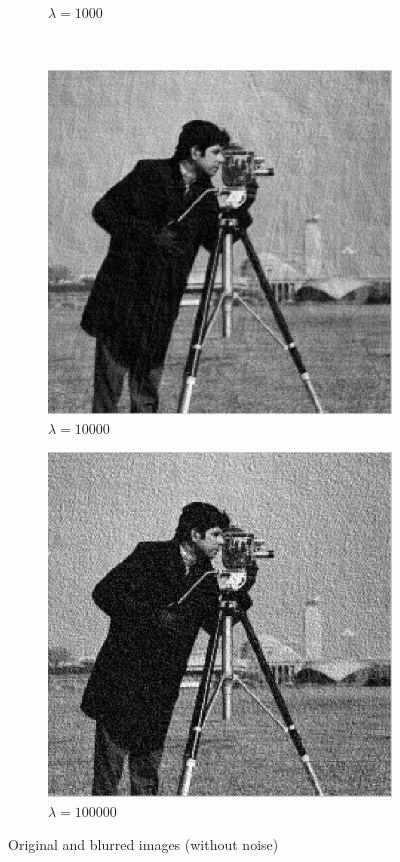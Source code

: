 \documentclass[a4paper, 10pt, conference] {article}
\begin{document}
\begin{figure}[H]
\begin{subfigure}{0.49\textwidth}
		\caption{$\lambda = 1000$}
	\end{subfigure}\\
	\begin{subfigure}{0.49\textwidth} 
		\centering						
		\includegraphics[scale=0.48]{motion/no_noise/lam10000.PNG}
		\caption{$\lambda = 10000$}
	\end{subfigure}
	\begin{subfigure}{0.49\textwidth} 
		\centering						
		\includegraphics[scale=0.48]{motion/no_noise/lam100000.PNG}
		\caption{$\lambda = 100000$}
	\end{subfigure}
	\caption{Original and blurred images (without noise)}
	\label{noNoiseRecovered}
\end{figure}
\end{document}
